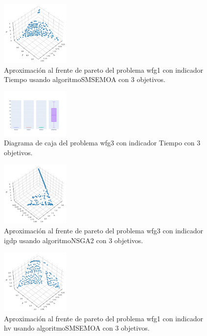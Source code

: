 \documentclass{article}
\begin{document}
\begin{figure}
	\includegraphics[width=0.3\textwidth]{SMSEMOA_wfg1_Tiempo_3_fp.png}
	\caption{Aproximación al frente de pareto del problema wfg1 con indicador Tiempo usando algoritmoSMSEMOA con 3 objetivos.}
\end{figure}
\begin{figure}
	\includegraphics[width=0.3\textwidth]{wfg3_Tiempo_3_bp.png}
	\caption{Diagrama de caja del problema wfg3 con indicador Tiempo con 3 objetivos.}
\end{figure}
\clearpage
\begin{figure}
	\includegraphics[width=0.3\textwidth]{NSGA2_wfg3_igdp_3_fp.png}
	\caption{Aproximación al frente de pareto del problema wfg3 con indicador igdp usando algoritmoNSGA2 con 3 objetivos.}
\end{figure}
\begin{figure}
	\includegraphics[width=0.3\textwidth]{SMSEMOA_wfg1_hv_3_fp.png}
	\caption{Aproximación al frente de pareto del problema wfg1 con indicador hv usando algoritmoSMSEMOA con 3 objetivos.}
\end{figure}
\end{document}
